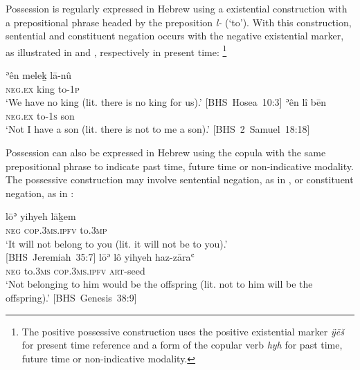 ﻿\documentclass[output=paper]{langsci/langscibook}
\begin{document}
Possession is regularly expressed in Hebrew using a existential
construction with a prepositional phrase headed by the preposition
\textit{l-} (`to'). With this construction, sentential and constituent
negation occurs with the negative existential marker, as illustrated in
 and , respectively in present
time:%
%
\footnote{The positive possessive construction uses the positive
existential marker \textit{ÿēš} for present time reference and a form of
the copular verb \textit{hyh} for past time, future time or non-indicative
modality.}
%
\begin{exe}\ex
\begin{xlist}\ex\label{ex:heb-no-king}
\gll ʾên meleḵ lā-nû\\ 
  \textsc{neg.ex}  king  to-1\textsc{p}\\ 
  \glt `We have no king (lit. there is no king for us).'
  \mbox{[BHS Hosea 10:3]}
\ex\label{ex:heb-no-son}
\gll ʾên lî bēn\\
\textsc{neg.ex}  to-1\textsc{s}  son\\ 
  \glt `Not I have a son (lit. there is not to me a son).'
  \mbox{[BHS 2 Samuel 18:18]}
\end{xlist}\end{exe}
Possession can also be expressed in Hebrew using the copula with the same
prepositional phrase to indicate past time, future time or non-indicative
modality. The possessive construction  may involve sentential negation, as
in , or constituent negation, as in
:
%
\begin{exe}\ex\begin{xlist}
\ex\label{ex:heb-not-for-you}
\gll lōʾ yihyeh lāḵem \\ 
  \textsc{neg} \textsc{cop.3ms.ipfv} to.\textsc{3mp}\\ 
  \glt `It will not belong to you (lit. it will not be to you).'\\
  \mbox{[BHS Jeremiah 35:7]}
\ex\label{ex:heb-no-offspring}
\gll lōʾ lô yihyeh haz-zāraʿ\\
\textsc{neg} to.\textsc{3ms} \textsc{cop.3ms.ipfv} \textsc{art}-seed\\
\glt `Not belonging to him would be the offspring (lit. not to him will be
the offspring).' \mbox{[BHS Genesis 38:9]}
\end{xlist}\end{exe}
\end{document}
